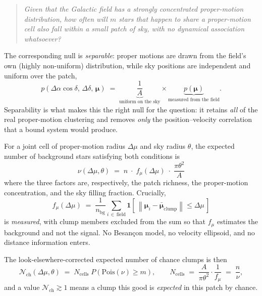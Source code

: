 \documentclass[11pt,a4paper]{article}
\newcommand{\pmvec}{\boldsymbol{\mu}}
\newcommand{\Nchance}{\mathcal{N}_{\mathrm{ch}}}
\begin{document}
\begin{quote}
\itshape
Given that the Galactic field has a strongly concentrated proper-motion
distribution, how often will $m$ stars that happen to share a proper-motion cell
\emph{also} fall within a small patch of sky, with no dynamical association
whatsoever?
\end{quote}

The corresponding null is \emph{separable}: proper motions are drawn from the
field's own (highly non-uniform) distribution, while sky positions are independent
and uniform over the patch,
%
\begin{equation}
p(\Delta\alpha\cos\delta,\,\Delta\delta,\,\pmvec)
\;=\;
\underbrace{\frac{1}{A}}_{\text{uniform on the sky}}
\times
\underbrace{p(\pmvec)}_{\text{measured from the field}} .
\label{eq:separable}
\end{equation}
%
Separability is what makes this the right null for the question: it retains
\emph{all} of the real proper-motion clustering and removes \emph{only} the
position--velocity correlation that a bound system would produce.

For a joint cell of proper-motion radius $\Delta\mu$ and sky radius $\theta$, the
expected number of background stars satisfying both conditions is
%
\begin{equation}
\boxed{\;
\nu(\Delta\mu,\theta)
\;=\;
n \;\cdot\; f_\mu(\Delta\mu) \;\cdot\; \frac{\pi\theta^{2}}{A}
\;}
\label{eq:nu}
\end{equation}
%
where the three factors are, respectively, the patch richness, the proper-motion
concentration, and the sky filling fraction. Crucially,
%
\begin{equation}
f_\mu(\Delta\mu)
\;=\;
\frac{1}{n_{\mathrm{bg}}}
\sum_{i \,\in\, \text{field}}
\mathbf{1}\!\left[\,\left\|\pmvec_i-\bar{\pmvec}_{\mathrm{clump}}\right\| \le \Delta\mu\,\right]
\label{eq:fmu}
\end{equation}
%
is \emph{measured}, with clump members excluded from the sum so that
$f_\mu$ estimates the background and not the signal. No Besan\c{c}on model, no
velocity ellipsoid, and no distance information enters.

The look-elsewhere-corrected expected number of chance clumps is then
%
\begin{equation}
\Nchance(\Delta\mu,\theta)
\;=\;
N_{\mathrm{cells}}\;P\!\left(\mathrm{Pois}(\nu) \ge m\right),
\qquad
N_{\mathrm{cells}} \;=\; \frac{A}{\pi\theta^{2}}\cdot\frac{1}{f_\mu} \;=\; \frac{n}{\nu} ,
\label{eq:Nchance}
\end{equation}
%
and a value $\Nchance \gtrsim 1$ means a clump this good is \emph{expected} in
this patch by chance.
\end{document}

